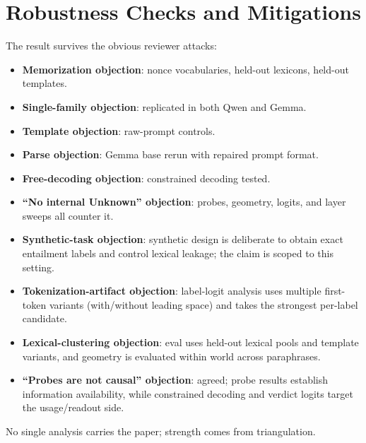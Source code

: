 \documentclass[11pt]{article}
\begin{document}
\section{Robustness Checks and Mitigations}
The result survives the obvious reviewer attacks:
\begin{itemize}
  \item \textbf{Memorization objection}: nonce vocabularies, held-out lexicons, held-out templates.
  \item \textbf{Single-family objection}: replicated in both Qwen and Gemma.
  \item \textbf{Template objection}: raw-prompt controls.
  \item \textbf{Parse objection}: Gemma base rerun with repaired prompt format.
  \item \textbf{Free-decoding objection}: constrained decoding tested.
  \item \textbf{``No internal Unknown'' objection}: probes, geometry, logits, and layer sweeps all counter it.
  \item \textbf{Synthetic-task objection}: synthetic design is deliberate to obtain exact entailment labels and control lexical leakage; the claim is scoped to this setting.
  \item \textbf{Tokenization-artifact objection}: label-logit analysis uses multiple first-token variants (with/without leading space) and takes the strongest per-label candidate.
  \item \textbf{Lexical-clustering objection}: eval uses held-out lexical pools and template variants, and geometry is evaluated within world across paraphrases.
  \item \textbf{``Probes are not causal'' objection}: agreed; probe results establish information availability, while constrained decoding and verdict logits target the usage/readout side.
\end{itemize}

No single analysis carries the paper; strength comes from triangulation.
\end{document}
